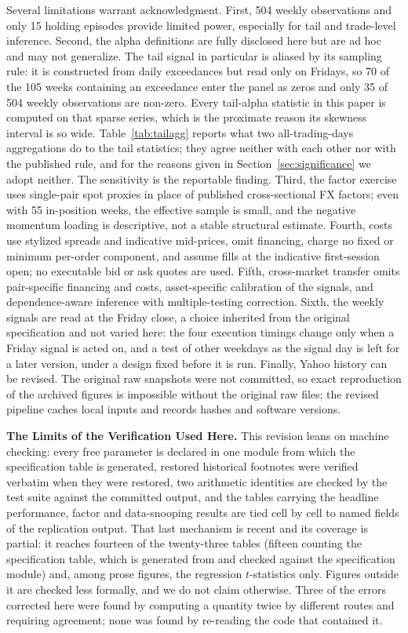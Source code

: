 \documentclass[11pt]{article}
\begin{document}
Several limitations warrant acknowledgment. First, 504 weekly observations and only 15 holding episodes provide limited power, especially for tail and trade-level inference. Second, the alpha definitions are fully disclosed here but are ad hoc and may not generalize. The tail signal in particular is aliased by its sampling rule: it is constructed from daily exceedances but read only on Fridays, so 70 of the 105 weeks containing an exceedance enter the panel as zeros and only 35 of 504 weekly observations are non-zero. Every tail-alpha statistic in this paper is computed on that sparse series, which is the proximate reason its skewness interval is so wide. Table~\ref{tab:tailagg} reports what two all-trading-days aggregations do to the tail statistics; they agree neither with each other nor with the published rule, and for the reasons given in Section~\ref{sec:significance} we adopt neither. The sensitivity is the reportable finding. Third, the factor exercise uses single-pair spot proxies in place of published cross-sectional FX factors; even with 55 in-position weeks, the effective sample is small, and the negative momentum loading is descriptive, not a stable structural estimate. Fourth, costs use stylized spreads and indicative mid-prices, omit financing, charge no fixed or minimum per-order component, and assume fills at the indicative first-session open; no executable bid or ask quotes are used. Fifth, cross-market transfer omits pair-specific financing and costs, asset-specific calibration of the signals, and dependence-aware inference with multiple-testing correction. Sixth, the weekly signals are read at the Friday close, a choice inherited from the original specification and not varied here: the four execution timings change only when a Friday signal is acted on, and a test of other weekdays as the signal day is left for a later version, under a design fixed before it is run. Finally, Yahoo history can be revised. The original raw snapshots were not committed, so exact reproduction of the archived figures is impossible without the original raw files; the revised pipeline caches local inputs and records hashes and software versions.

\textbf{The Limits of the Verification Used Here.} This revision leans on machine checking: every free parameter is declared in one module from which the specification table is generated, restored historical footnotes were verified verbatim when they were restored, two arithmetic identities are checked by the test suite against the committed output, and the tables carrying the headline performance, factor and data-snooping results are tied cell by cell to named fields of the replication output. That last mechanism is recent and its coverage is partial: it reaches fourteen of the twenty-three tables (fifteen counting the specification table, which is generated from and checked against the specification module) and, among prose figures, the regression $t$-statistics only. Figures outside it are checked less formally, and we do not claim otherwise. Three of the errors corrected here were found by computing a quantity twice by different routes and requiring agreement; none was found by re-reading the code that contained it.
\end{document}
